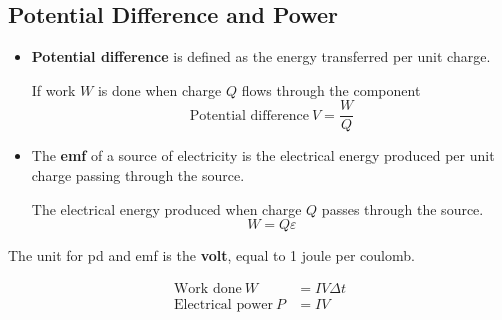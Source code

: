 \subsection{Potential Difference and Power}

\begin{itemize}
    \item \textbf{Potential difference} is defined as the energy transferred per unit charge.

        If work $W$ is done when charge $Q$ flows through the component
        $$\text{Potential difference}\ V=\frac{W}{Q}$$
    \item The \textbf{emf} of a source of electricity is the electrical energy produced per unit charge passing through the source.

        The electrical energy produced when charge $Q$ passes through the source.
        $$W=Q\varepsilon$$
\end{itemize}


The unit for pd and emf is the \textbf{volt}, equal to 1 joule per coulomb.

\begin{align*}
    \text{Work done}\ W&=IV\Delta t\\
    \text{Electrical power}\ P&=IV
\end{align*}
